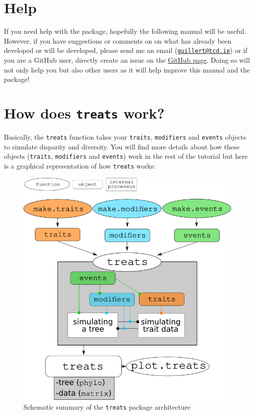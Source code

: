 \documentclass[
]{book}
\begin{document}
\hypertarget{help}{%
\section{Help}\label{help}}

If you need help with the package, hopefully the following manual will be useful.
However, if you have suggestions or comments on on what has already been developed or will be developed, please send me an email (\href{mailto:guillert@tcd.ie}{\nolinkurl{guillert@tcd.ie}}) or if you are a GitHub user, directly create an issue on the \href{https://github.com/TGuillerme/treats}{GitHub page}.
Doing so will not only help you but also other users as it will help improve this manual and the package!

\hypertarget{how-does-treats-work}{%
\section{\texorpdfstring{How does \texttt{treats} work?}{How does treats work?}}\label{how-does-treats-work}}

Basically, the \texttt{treats} function takes your \texttt{traits}, \texttt{modifiers} and \texttt{events} objects to simulate disparity and diversity.
You will find more details about how these objects (\texttt{traits}, \texttt{modifiers} and \texttt{events}) work in the rest of the tutorial but here is a graphical representation of how \texttt{treats} works:

\begin{figure}
\centering
\includegraphics{treats_structure.png}
\caption{Schematic summary of the \texttt{treats} package architecture}
\end{figure}
\end{document}
